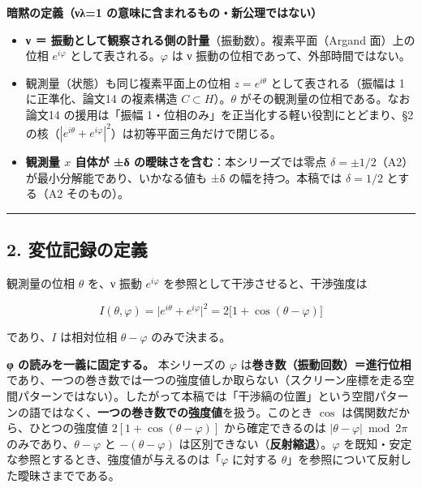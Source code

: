\documentclass[
]{ltjsarticle}
\providecommand{\tightlist}{%
  \setlength{\itemsep}{0pt}\setlength{\parskip}{0pt}}
\begin{document}
\textbf{暗黙の定義（νλ=1 の意味に含まれるもの・新公理ではない）}

\begin{itemize}
\tightlist
\item
  \textbf{ν ＝ 振動として観察される側の計量}（振動数）。複素平面（Argand
  面）上の位相 \(e^{i\varphi}\) として表される。\(\varphi\) は ν
  振動の位相であって、外部時間ではない。
\item
  観測量（状態）も同じ複素平面上の位相 \(z=e^{i\theta}\)
  として表される（振幅は 1 に正準化、論文14 の複素構造
  \(C\subset H\)）。\(\theta\) がその観測量の位相である。なお論文14
  の援用は「振幅 1・位相のみ」を正当化する軽い役割にとどまり、§2
  の核（\(|e^{i\theta}+e^{i\varphi}|^2\)）は初等平面三角だけで閉じる。
\item
  \textbf{観測量 \(x\) 自体が ±δ の曖昧さを含む}：本シリーズでは零点
  \(\delta=\pm 1/2\)（A2）が最小分解能であり、いかなる値も ±δ
  の幅を持つ。本稿では \(\delta=1/2\) とする（A2 そのもの）。
\end{itemize}

\begin{center}\rule{0.5\linewidth}{0.5pt}\end{center}

\subsection{2.
変位記録の定義}\label{ux5909ux4f4dux8a18ux9332ux306eux5b9aux7fa9}

観測量の位相 \(\theta\) を、ν 振動 \(e^{i\varphi}\)
を参照として干渉させると、干渉強度は

\[
I(\theta,\varphi)=\bigl|e^{i\theta}+e^{i\varphi}\bigr|^2=2\bigl[1+\cos(\theta-\varphi)\bigr]
\]

であり、\(I\) は相対位相 \(\theta-\varphi\) のみで決まる。

\textbf{φ の読みを一義に固定する。} 本シリーズの \(\varphi\)
は\textbf{巻き数（振動回数）＝進行位相}であり、一つの巻き数では一つの強度値しか取らない（スクリーン座標を走る空間パターンではない）。したがって本稿では「干渉縞の位置」という空間パターンの語ではなく、\textbf{一つの巻き数での強度値}を扱う。このとき
\(\cos\) は偶関数だから、ひとつの強度値 \(2[1+\cos(\theta-\varphi)]\)
から確定できるのは \(|\theta-\varphi|\bmod 2\pi\)
のみであり、\(\theta-\varphi\) と \(-(\theta-\varphi)\)
は区別できない（\textbf{反射縮退}）。\(\varphi\)
を既知・安定な参照とするとき、強度値が与えるのは「\(\varphi\) に対する
\(\theta\)」を参照について反射した曖昧さまでである。
\end{document}
